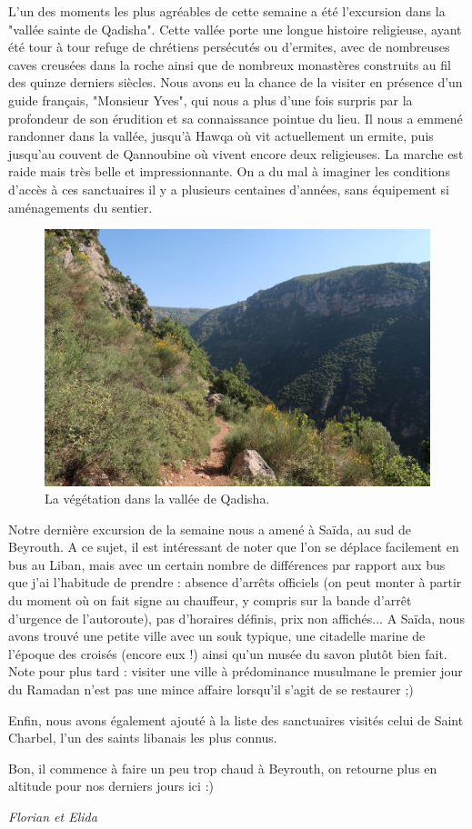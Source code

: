 L'un des moments les plus agréables de cette semaine a été l'excursion
dans la "vallée sainte de Qadisha". Cette vallée porte une longue
histoire religieuse, ayant été tour à tour refuge de chrétiens
persécutés ou d'ermites, avec de nombreuses caves creusées dans la roche
ainsi que de nombreux monastères construits au fil des quinze derniers
siècles. Nous avons eu la chance de la visiter en présence d'un guide
français, "Monsieur Yves", qui nous a plus d'une fois surpris par la
profondeur de son érudition et sa connaissance pointue du lieu. Il nous
a emmené randonner dans la vallée, jusqu'à Hawqa où vit actuellement un
ermite, puis jusqu'au couvent de Qannoubine où vivent encore deux
religieuses. La marche est raide mais très belle et impressionnante. On
a du mal à imaginer les conditions d'accès à ces sanctuaires il y a
plusieurs centaines d'années, sans équipement si aménagements du
sentier.

\begin{figure}
\centering
\includegraphics{images/20180521_qadisha.JPG}
\caption{La végétation dans la vallée de Qadisha.}
\end{figure}

Notre dernière excursion de la semaine nous a amené à Saïda, au sud de
Beyrouth. A ce sujet, il est intéressant de noter que l'on se déplace
facilement en bus au Liban, mais avec un certain nombre de différences
par rapport aux bus que j'ai l'habitude de prendre : absence d'arrêts
officiels (on peut monter à partir du moment où on fait signe au
chauffeur, y compris sur la bande d'arrêt d'urgence de l'autoroute), pas
d'horaires définis, prix non affichés... A Saïda, nous avons trouvé une
petite ville avec un souk typique, une citadelle marine de l'époque des
croisés (encore eux !) ainsi qu'un musée du savon plutôt bien fait. Note
pour plus tard : visiter une ville à prédominance musulmane le premier
jour du Ramadan n'est pas une mince affaire lorsqu'il s'agit de se
restaurer ;)

Enfin, nous avons également ajouté à la liste des sanctuaires visités
celui de Saint Charbel, l'un des saints libanais les plus connus.

Bon, il commence à faire un peu trop chaud à Beyrouth, on retourne plus
en altitude pour nos derniers jours ici :)

\emph{Florian et Elida}


